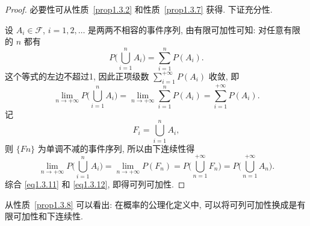 \begin{proof}
  必要性可从性质~\ref{prop1.3.2} 和性质~\ref{prop1.3.7} 获得.
  下证充分性.

  设 $A_i \in \mathscr{F}$, $i=1,2,\dotsc$ 是两两不相容的事件序列,
  由有限可加性可知:
  对任意有限的 $n$ 都有
  \[
    P \biggl( \bigcup _{i=1} ^n A_i \biggr) = \sum _{i=1} ^n P (A_i).
  \]
  这个等式的左边不超过1,
  因此正项级数 $\sum _{i=1} ^{+\infty} P (A_i)$ 收敛,
  即
  \begin{equation}
    \lim _{n \to +\infty} P \biggl( \bigcup _{i=1} ^n A_i \biggr)
    = \lim _{n \to +\infty} \sum _{i=1} ^n P (A_i)
    = \sum _{i=1} ^{+\infty} P (A_i).
    \label{eq1.3.11}
  \end{equation}
  记
  \[
    F_i = \bigcup _{i=1} ^n A_i,
  \]
  则 $\{Fn\}$ 为单调不减的事件序列,
  所以由下连续性得
  \begin{equation}
    \lim _{n \to +\infty} P \biggl( \bigcup _{i=1} ^n A_i \biggr)
    = \lim _{n \to +\infty} P (F_n)
    = P \biggl( \bigcup _{n=1} ^{+\infty} F_n \biggr)
    = P \biggl( \bigcup _{n=1} ^{+\infty} A_n \biggr).
    \label{eq1.3.12}
  \end{equation}
  综合 \eqref{eq1.3.11} 和 \eqref{eq1.3.12},
  即得可列可加性.
\end{proof}

从性质~\ref{prop1.3.8} 可以看出:
在概率的公理化定义中,
可以将可列可加性换成是有限可加性和下连续性.

